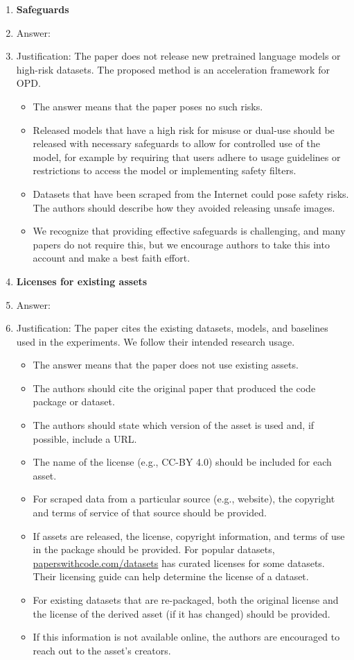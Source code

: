 \documentclass{article}
\begin{document}
\begin{enumerate}
\item {\bf Safeguards}
    \item[] Answer: \answerNA{}
    \item[] Justification: The paper does not release new pretrained language models or high-risk datasets. The proposed method is an acceleration framework for OPD.
    \begin{itemize}
        \item The answer \answerNA{} means that the paper poses no such risks.
        \item Released models that have a high risk for misuse or dual-use should be released with necessary safeguards to allow for controlled use of the model, for example by requiring that users adhere to usage guidelines or restrictions to access the model or implementing safety filters. 
        \item Datasets that have been scraped from the Internet could pose safety risks. The authors should describe how they avoided releasing unsafe images.
        \item We recognize that providing effective safeguards is challenging, and many papers do not require this, but we encourage authors to take this into account and make a best faith effort.
    \end{itemize}

\item {\bf Licenses for existing assets}
    \item[] Answer: \answerYes{}
    \item[] Justification: The paper cites the existing datasets, models, and baselines used in the experiments. We follow their intended research usage.
    \begin{itemize}
        \item The answer \answerNA{} means that the paper does not use existing assets.
        \item The authors should cite the original paper that produced the code package or dataset.
        \item The authors should state which version of the asset is used and, if possible, include a URL.
        \item The name of the license (e.g., CC-BY 4.0) should be included for each asset.
        \item For scraped data from a particular source (e.g., website), the copyright and terms of service of that source should be provided.
        \item If assets are released, the license, copyright information, and terms of use in the package should be provided. For popular datasets, \url{paperswithcode.com/datasets} has curated licenses for some datasets. Their licensing guide can help determine the license of a dataset.
        \item For existing datasets that are re-packaged, both the original license and the license of the derived asset (if it has changed) should be provided.
        \item If this information is not available online, the authors are encouraged to reach out to the asset's creators.
    \end{itemize}


\end{enumerate}
\end{document}
